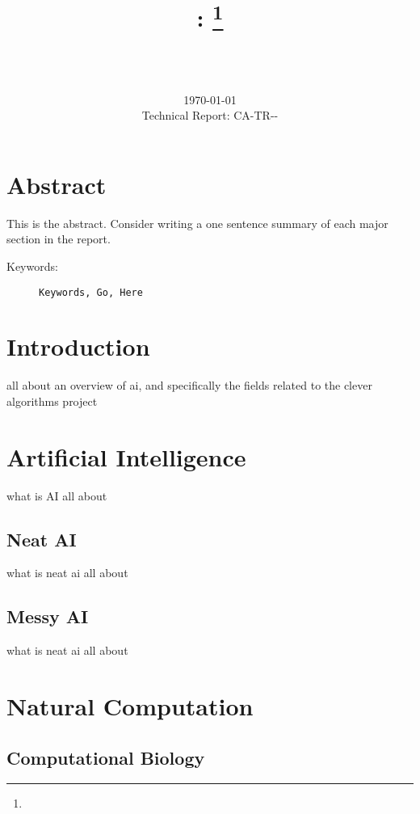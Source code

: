 \documentclass[a4paper, 11pt]{article}
\title{{\myreporttitle}: {\myreportsubtitle}\footnote{\myreportlicense}}
\author{\myreportauthor\\{\myreportemail}\\\small\myreportproject}
\date{\today\\{\small{Technical Report: CA-TR-{\myreportdate}-\myreportversion}}}
\begin{document}
\maketitle

\section*{Abstract} 
This is the abstract. Consider writing a one sentence summary of each major section in the report.

\begin{description}
	\item[Keywords:] {\small\texttt{Keywords, Go, Here}}
\end{description} 

\section{Introduction}
\label{sec:introduction}

all about an overview of ai, and specifically the fields related to the clever algorithms project

% 
% 
\section{Artificial Intelligence}
\label{sec:artificial_intelligence}
what is AI all about

\subsection{Neat AI}
what is neat ai all about

\subsection{Messy AI}
what is neat ai all about


% 
% 
\section{Natural Computation}

\subsection{Computational Biology}
\end{document}
